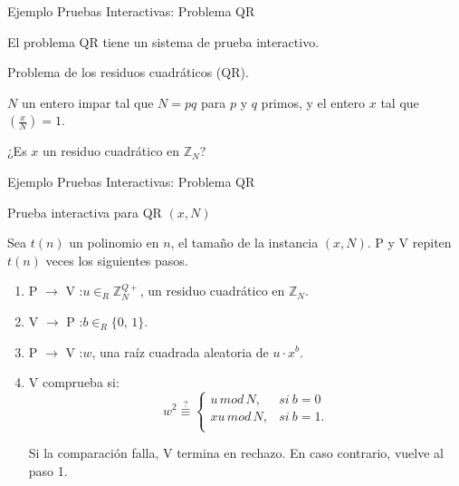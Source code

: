 \documentclass{beamer}
\begin{document}
\begin{frame}{Ejemplo Pruebas Interactivas: Problema QR}
	\begin{theorem}
		El problema QR tiene un sistema de prueba interactivo.
	\end{theorem}

	\begin{description}[Parámetros]
		\item[Nombre] Problema de los residuos cuadr\'aticos (QR).
		\item[Parámetros] $N$ un entero impar tal que $N = pq$ para $p$ y $q$ primos, y el entero $x$ tal que $\left( \frac{x}{N} \right) = 1$.
		\item[Pregunta] ¿Es $x$ un residuo cuadrático en ${\mathbb Z}_N$?
	\end{description}
\end{frame}


\begin{frame}{Ejemplo Pruebas Interactivas: Problema QR}
\begin{block}{Prueba interactiva para QR $(x,N)$}
	
	Sea $t(n)$ un polinomio en $n$, el tamaño de la instancia $(x,N)$. P y V repiten $t(n)$ veces los siguientes pasos.
	
	\begin{enumerate}
		
		\item P $\rightarrow$ V :\quad $u \in_R \mathbb{Z}^{Q+}_N$, \; un residuo cuadrático en $\mathbb{Z}_N$.
		
		\item V $\rightarrow$ P :\quad $b \in_R \{0,\,1\}$.
		
		\item P $\rightarrow$ V :\quad $w$,\; una raíz cuadrada aleatoria de $u\cdot x^b$.
		
		\item V comprueba si:
		\[
		w^2 \overset{?}{\equiv}
		\begin{cases}
		u\, mod\, N, & si\ b = 0\\
		xu\, mod\, N, & si\ b = 1.\\
		\end{cases}
		\]
		
		Si la comparación falla, V termina en rechazo. En caso contrario, vuelve al paso 1.
		
	\end{enumerate}
	
\end{block}

\end{frame}
\end{document}
